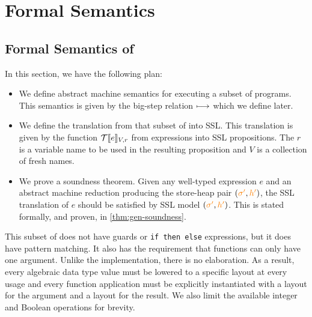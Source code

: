 \section{Formal Semantics}
\label{sec:semantics}


\subsection{Formal Semantics of \tool}
\label{sec:formal}

In this section, we have the following plan:

\begin{itemize}
  \item We define abstract machine semantics for executing a subset of \tool programs. This semantics
    is given by the big-step relation $\longmapsto$ which we define later.
  \item We define the translation from that subset of \tool into SSL. This translation is given by the
    function $\mathcal{T}\llbracket e\rrbracket_{V,r}$ from \tool expressions into SSL propositions. The $r$ is a variable name to
    be used in the resulting proposition and $V$ is a collection of fresh names.
  \item We prove a soundness theorem. Given any well-typed expression $e$ and an abstract machine reduction producing
    the store-heap pair $({\color{orange} \sigma'}, {\color{orange} h'})$, the SSL translation of $e$ should be satisfied by SSL model $({\color{orange} \sigma'}, {\color{orange} h'})$. This is stated formally, and proven,
    in \autoref{thm:gen-soundness}.
\end{itemize}

This subset of \tool does not have guards or \verb|if then else| expressions, but it does have pattern
matching. It also has the requirement that functions can only have one argument. Unlike the implementation, there
is no elaboration. As a result, every algebraic data type value must be lowered to a specific layout at every usage
and every function application must be explicitly instantiated with a layout for the argument and a layout for the result. We
also limit the available integer and Boolean operations for brevity.

